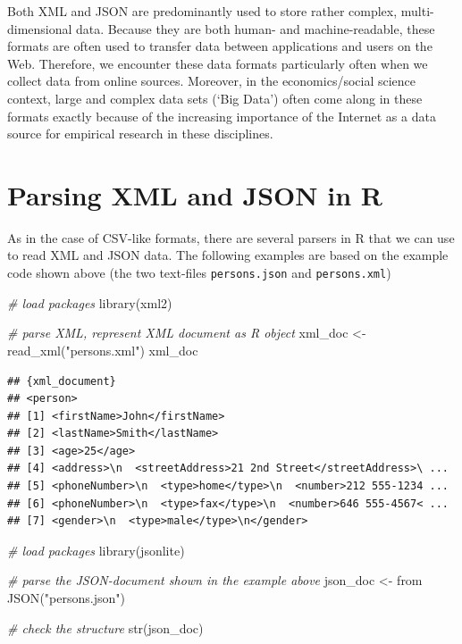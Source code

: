 \documentclass[
  12pt,
]{style/krantz}
\newenvironment{Shaded}{\begin{snugshade}}{\end{snugshade}}
\newcommand{\CommentTok}[1]{\textcolor[rgb]{0.56,0.35,0.01}{\textit{#1}}}
\newcommand{\FunctionTok}[1]{\textcolor[rgb]{0.00,0.00,0.00}{#1}}
\newcommand{\NormalTok}[1]{#1}
\newcommand{\OtherTok}[1]{\textcolor[rgb]{0.56,0.35,0.01}{#1}}
\newcommand{\StringTok}[1]{\textcolor[rgb]{0.31,0.60,0.02}{#1}}
\begin{document}
Both XML and JSON are predominantly used to store rather complex, multi-dimensional data. Because they are both human- and machine-readable, these formats are often used to transfer data between applications and users on the Web. Therefore, we encounter these data formats particularly often when we collect data from online sources. Moreover, in the economics/social science context, large and complex data sets (`Big Data') often come along in these formats exactly because of the increasing importance of the Internet as a data source for empirical research in these disciplines.

\hypertarget{parsing-xml-and-json-in-r}{%
\section{Parsing XML and JSON in R}\label{parsing-xml-and-json-in-r}}

As in the case of CSV-like formats, there are several parsers in R that we can use to read XML and JSON data. The following examples are based on the example code shown above (the two text-files \texttt{persons.json} and \texttt{persons.xml})

\begin{Shaded}
\begin{Highlighting}[]
\CommentTok{\# load packages}
\FunctionTok{library}\NormalTok{(xml2)}

\CommentTok{\# parse XML, represent XML document as R object}
\NormalTok{xml\_doc }\OtherTok{\textless{}{-}} \FunctionTok{read\_xml}\NormalTok{(}\StringTok{"persons.xml"}\NormalTok{)}
\NormalTok{xml\_doc}
\end{Highlighting}
\end{Shaded}

\begin{verbatim}
## {xml_document}
## <person>
## [1] <firstName>John</firstName>
## [2] <lastName>Smith</lastName>
## [3] <age>25</age>
## [4] <address>\n  <streetAddress>21 2nd Street</streetAddress>\ ...
## [5] <phoneNumber>\n  <type>home</type>\n  <number>212 555-1234 ...
## [6] <phoneNumber>\n  <type>fax</type>\n  <number>646 555-4567< ...
## [7] <gender>\n  <type>male</type>\n</gender>
\end{verbatim}

\begin{Shaded}
\begin{Highlighting}[]
\CommentTok{\# load packages}
\FunctionTok{library}\NormalTok{(jsonlite)}

\CommentTok{\# parse the JSON{-}document shown in the example above}
\NormalTok{json\_doc }\OtherTok{\textless{}{-}}\NormalTok{ from }\FunctionTok{JSON}\NormalTok{(}\StringTok{"persons.json"}\NormalTok{)}

\CommentTok{\# check the structure}
\FunctionTok{str}\NormalTok{(json\_doc)}
\end{Highlighting}
\end{Shaded}
\end{document}
